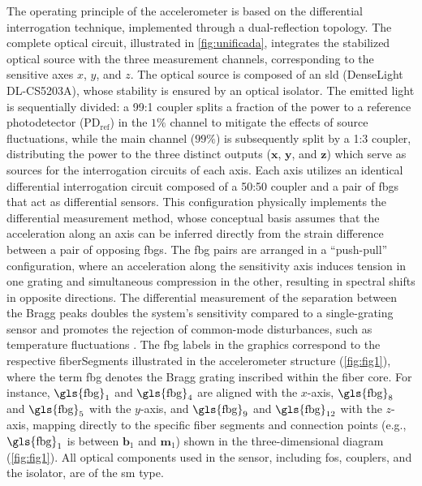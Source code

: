 \documentclass[sensors,article,accept,pdftex,moreauthors]{Definitions/mdpi}
\begin{document}
The operating principle of the accelerometer is based on the differential interrogation technique, implemented through a dual-reflection topology.
The complete optical circuit, illustrated in \cref{fig:unificada}, integrates the stabilized optical source with the three measurement channels, corresponding to the sensitive axes $x$, $y$, and $z$.
The optical source is composed of an \gls{sld} (DenseLight DL-CS5203A), whose stability is ensured by an optical isolator. The emitted light is sequentially divided: a 99:1 coupler splits a fraction of the power to a reference photodetector ($\text{PD}_{\text{ref}}$) in the $1\%$ channel to mitigate the effects of source fluctuations, while the main channel ($99\%$) is subsequently split by a 1:3 coupler, distributing the power to the three distinct outputs ($\mathbf{x}$, $\mathbf{y}$, and $\mathbf{z}$) which serve as sources for the interrogation circuits of each axis.
Each axis utilizes an identical differential interrogation circuit composed of a 50:50 coupler and a pair of \glspl{fbg} that act as differential sensors. This configuration physically implements the differential measurement method, whose conceptual basis assumes that the acceleration along an axis can be inferred directly from the strain difference between a pair of opposing \glspl{fbg}. The \gls{fbg} pairs are arranged in a ``push-pull'' configuration, where an acceleration along the sensitivity axis induces tension in one grating and simultaneous compression in the other, resulting in spectral shifts in opposite directions. The differential measurement of the separation between the Bragg peaks doubles the system's sensitivity compared to a single-grating sensor and promotes the rejection of common-mode disturbances, such as temperature fluctuations \citep{Cazo2008}. The \gls{fbg} labels in the graphics correspond to the respective \glspl{fiberSegment} illustrated in the accelerometer structure (\cref{fig:fig1}), where the term \gls{fbg} denotes the Bragg grating inscribed within the fiber core. For instance, $\text{\gls{fbg}}_1$ and $\text{\gls{fbg}}_4$ are aligned with the $x$-axis, $\text{\gls{fbg}}_8$ and $\text{\gls{fbg}}_5$ with the $y$-axis, and $\text{\gls{fbg}}_9$ and $\text{\gls{fbg}}_{12}$ with the $z$-axis, mapping directly to the specific fiber segments and connection points (e.g., $\text{\gls{fbg}}_1$ is between $\mathbf{b}_1$ and $\mathbf{m}_1$) shown in the three-dimensional diagram (\cref{fig:fig1}). All optical components used in the sensor, including \glspl{fo}, couplers, and the isolator, are of the \gls{sm} type.
\end{document}
